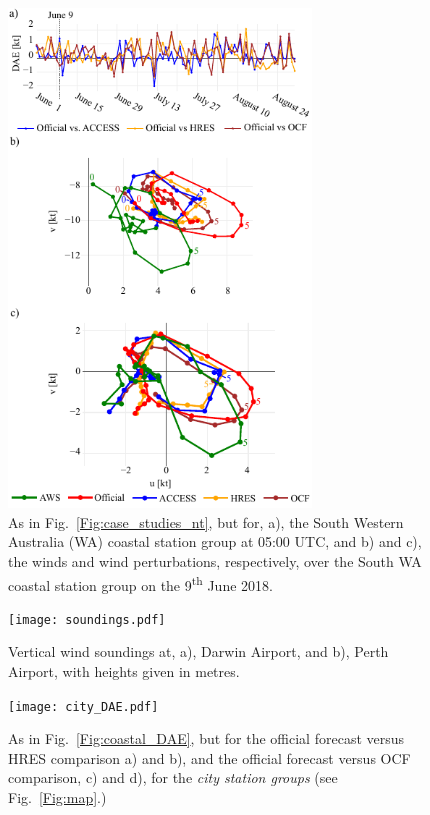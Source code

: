 \documentclass{ametsoc}
\begin{document}
\begin{figure}
\centering
\includegraphics[width=19pc]{case_studies_wa.pdf}
\caption{As in Fig.~\ref{Fig:case_studies_nt}, but for, a), the South Western Australia (WA) coastal station group at 05:00 UTC, and b) and c), the winds and wind perturbations, respectively, over the South WA coastal station group on the 9\textsuperscript{th} June 2018.} 
\label{Fig:case_studies_wa}
\end{figure}

\begin{figure}
\centering
\texttt{[image: soundings.pdf]}
\caption{Vertical wind soundings at, a), Darwin Airport, and b), Perth Airport, with heights given in metres.}
\label{Fig:soundings}
\end{figure}

\begin{figure}
\centering
\texttt{[image: city\_DAE.pdf]}
\caption{As in Fig.~\ref{Fig:coastal_DAE}, but for the official forecast versus HRES comparison a) and b), and the official forecast versus OCF comparison, c) and d), for the \textit{city station groups} (see Fig.~\ref{Fig:map}.)}
\label{Fig:city_DAE}
\end{figure}
\end{document}
